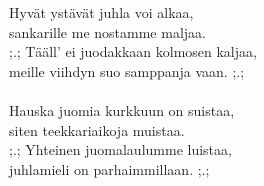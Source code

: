 
Hyvät ystävät juhla voi alkaa, \\ sankarille me nostamme maljaa. \\ ;.; Tääll' ei juodakkaan kolmosen kaljaa, \\ meille viihdyn suo samppanja vaan. ;.; \\ \hspace{10mm} \\ Hauska juomia kurkkuun on suistaa, \\ siten teekkariaikoja muistaa. \\ ;.; Yhteinen juomalaulumme luistaa, \\ juhlamieli on parhaimmillaan. ;.;